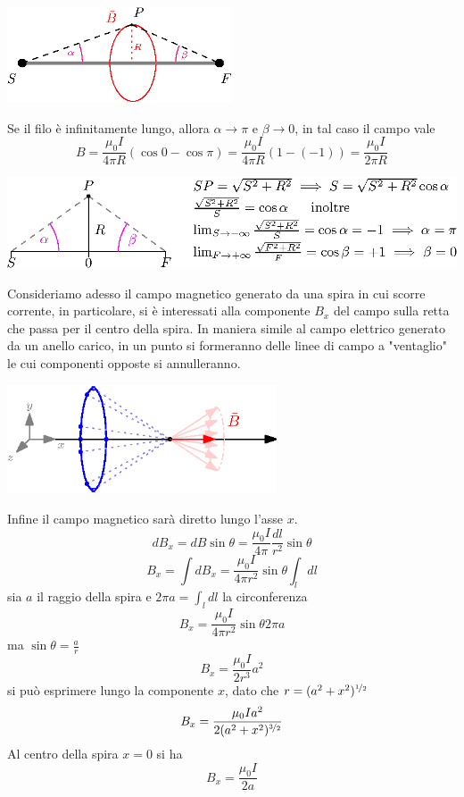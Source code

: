 \documentclass[10pt, letterpaper]{report}
\begin{document}
\begin{center}
    \includegraphics[width=0.5\textwidth ]{images/campoFilo2.eps}
\end{center}
Se il filo è infinitamente lungo, allora $\alpha\rightarrow \pi$ e $\beta\rightarrow 0$, in tal caso il campo vale 
$$ B=\frac{\mu_0I}{4\pi R}(\cos0 - \cos\pi)=\frac{\mu_0I}{4\pi R}(1 - (-1))=\frac{\mu_0I}{2\pi R}$$
\begin{center}
    \includegraphics[width=\textwidth ]{images/alphaa02.eps}
\end{center}
Consideriamo adesso il campo magnetico generato da una spira in cui scorre corrente, in particolare, si è interessati alla componente $B_x$ del campo sulla retta che passa per il centro della spira. In maniera simile al campo elettrico generato da un anello carico, in un punto si formeranno delle linee di campo a "ventaglio" le cui componenti opposte si annulleranno.\begin{center}
    \includegraphics[width=0.6\textwidth ]{images/campoSpira.eps}
\end{center}
Infine il campo magnetico sarà diretto lungo l'asse $x$.
$$ dB_x=dB\sin\theta=\frac{\mu_0I}{4\pi}\frac{dl}{r^2}\sin\theta$$
$$ B_x=\int dB_x=\frac{\mu_0I}{4\pi r^2}\sin\theta\int_l dl$$
sia $a$ il raggio della spira e $2\pi a=\int_l dl$ la circonferenza
$$ B_x=\frac{\mu_0I}{4\pi r^2}\sin\theta 2\pi  a $$
ma $\sin\theta = \frac{a}{r}$
$$ B_x=\frac{\mu_0I}{2 r^3} a^2 $$
si può esprimere lungo la componente $x$, dato che $r=(a^2+x^2)^{\nicefrac{1}{2}}$
$$ B_x=\frac{\mu_0Ia^2}{2 (a^2+x^2)^{\nicefrac{3}{2}}} $$
Al centro della spira $x=0$ si ha 
$$ B_x=\frac{\mu_0I}{2a}$$\flowerLine
\end{document}

